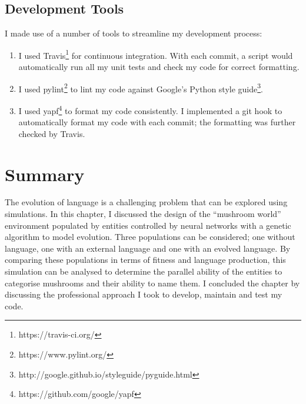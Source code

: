 \documentclass[12pt,a4paper]{report}
\begin{document}
\subsection{Development Tools}

I made use of a number of tools to streamline my development process:

\begin{enumerate}

\item I used Travis\footnote{https://travis-ci.org/} for continuous integration. With each commit, a script would automatically run all my unit tests and check my code for correct formatting.
	
\item I used pylint\footnote{https://www.pylint.org/} to lint my code against Google's Python style guide\footnote{http://google.github.io/styleguide/pyguide.html}.
	
\item I used yapf\footnote{https://github.com/google/yapf} to format my code consistently. I implemented a git hook to automatically format my code with each commit; the formatting was further checked by Travis.
	
\end{enumerate}

\section{Summary}\label{section:summary}
The evolution of language is a challenging problem that can be explored using simulations. In this chapter, I discussed the design of the ``mushroom world'' environment populated by entities controlled by neural networks with a genetic algorithm to model evolution. Three populations can be considered; one without language, one with an external language and one with an evolved language. By comparing these populations in terms of fitness and language production, this simulation can be analysed to determine the parallel ability of the entities to categorise mushrooms and their ability to name them. I concluded the chapter by discussing the professional approach I took to develop, maintain and test my code.

\end{document}
